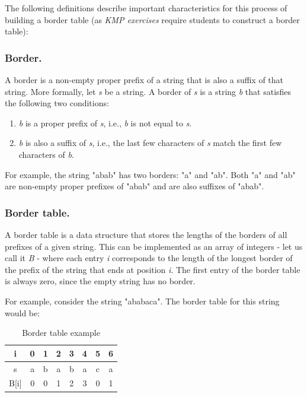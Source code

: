 \documentclass{l4proj}
\begin{document}
The following definitions describe important characteristics for this process of building a border table (as \emph{KMP exercises} require students to construct a border table):
\subsubsection{Border.}

A border is a non-empty proper prefix of a string that is also a suffix of that string. More formally, let \emph{s} be a string. A border of \emph{s} is a string \emph{b} that satisfies the following two conditions:
\begin{enumerate}
	\item
	\emph{b} is a proper prefix of \emph{s}, i.e., \emph{b} is not equal to \emph{s}.
	\item
	\emph{b} is also a suffix of \emph{s}, i.e., the last few characters of \emph{s} match the first few characters of \emph{b}.
\end{enumerate}
For example, the string "abab" has two borders: "a" and "ab". Both "a" and "ab" are non-empty proper prefixes of "abab" and are also suffixes of "abab".

\subsubsection{Border table.}

A border table is a data structure that stores the lengths of the borders of all prefixes of a given string. This can be implemented as an array of integers - let us call it \emph{B} - where each entry \emph{i} corresponds to the length of the longest border of the prefix of the string that ends at position \emph{i}. The first entry of the border table is always zero, since the empty string has no border.

For example, consider the string "ababaca". The border table for this string would be:

\begin{table}[!h]
\begin{center}
\begin{tabular}{|c||c|c|c|c|c|c|c|}
	\hline
	i & 0 & 1 & 2 & 3 & 4 & 5 & 6 \\
	\hline
	s & a & b & a & b & a & c & a \\
	\hline
	B[i] & 0 & 0 & 1 & 2 & 3 & 0 & 1 \\ 
	\hline
\end{tabular}
\caption{\label{tab:b-table}Border table example}
\end{center}
\end{table}
\end{document}
